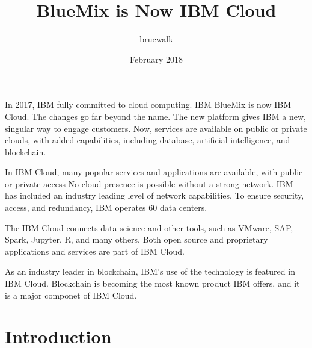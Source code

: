 \documentclass{article}
\title{BlueMix is Now IBM Cloud}
\author{brucwalk }
\date{February 2018}
\begin{document}
In 2017, IBM fully committed to cloud computing.  IBM BlueMix is now IBM Cloud.  The changes go far beyond the name.  The new platform gives IBM a new, singular way to engage customers.  \cite{hid-sp18-525-bluemix} Now, services are available on public or private clouds, with added capabilities, including database, artificial intelligence, and blockchain. \cite{hid-sp18-525-bluemix}

In IBM Cloud, many popular services and applications are available, with public or private access No cloud presence is possible without a strong network.  IBM has included an industry leading level of network capabilities.  To ensure security, access, and redundancy, IBM operates 60 data centers. \cite{hid-sp18-525-bluemix}  

The IBM Cloud connects data science and other tools, such as VMware, SAP, Spark, Jupyter, R, and many others. \cite{hid-sp18-525-bluemix} Both open source and proprietary applications and services are part of IBM Cloud.

As an industry leader in blockchain, IBM’s use of the technology is featured in IBM Cloud.  Blockchain is becoming the most known product IBM offers, and it is a major componet of IBM Cloud. \cite{hid-sp18-525-bluemix} 


\maketitle

\section{Introduction}
\end{document}
